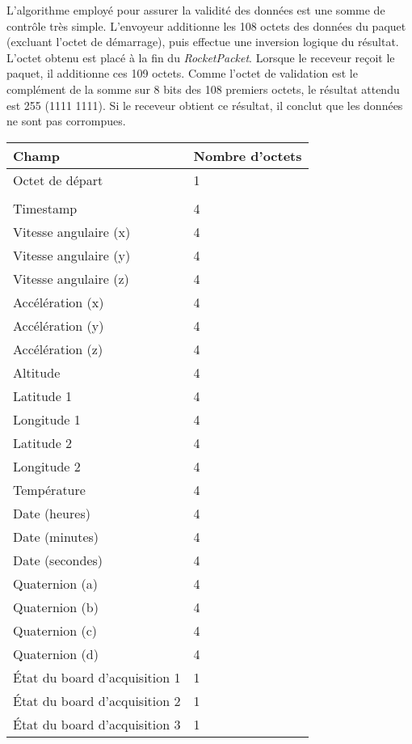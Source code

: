 L'algorithme employé pour assurer la validité des données est une somme de contrôle très simple. L'envoyeur additionne les 108 octets des données du paquet (excluant l'octet de démarrage), puis effectue une inversion logique du résultat. L'octet obtenu est placé à la fin du \emph{RocketPacket}. Lorsque le receveur reçoit le paquet, il additionne ces 109 octets. Comme l'octet de validation est le complément de la somme sur 8 bits des 108 premiers octets, le résultat attendu est 255 (1111 1111). Si le receveur obtient ce résultat, il conclut que les données ne sont pas corrompues.

\begin{table}
    \centering
    \begin{tabular}{|l|l|}
        \hline
        \textbf{Champ} & \textbf{Nombre d'octets} \\
        \hline
        Octet de départ & 1 \\
        &\\
        Timestamp & 4 \\
        Vitesse angulaire (x) & 4 \\
        Vitesse angulaire (y) & 4 \\
        Vitesse angulaire (z) & 4 \\
        Accélération (x) & 4 \\
        Accélération (y) & 4 \\
        Accélération (z) & 4 \\
        Altitude & 4 \\
        Latitude 1 & 4 \\
        Longitude 1 & 4 \\
        Latitude 2 & 4 \\
        Longitude 2 & 4 \\
        Température & 4 \\
        Date (heures) & 4 \\
        Date (minutes) & 4 \\
        Date (secondes) & 4 \\
        Quaternion (a) & 4 \\
        Quaternion (b) & 4 \\
        Quaternion (c) & 4 \\
        Quaternion (d) & 4 \\
        État du board d'acquisition 1 & 1 \\
        État du board d'acquisition 2 & 1 \\
        État du board d'acquisition 3 & 1 \\

\end{tabular}
\end{table}
